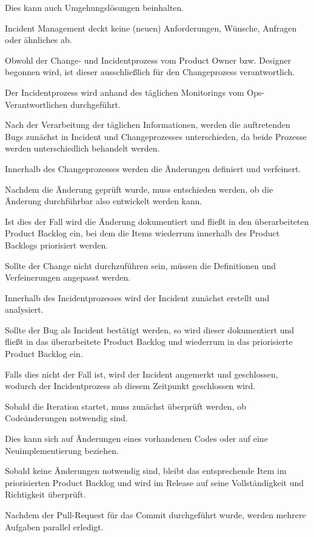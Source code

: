 Dies kann auch Umgehungslösungen beinhalten. 

Incident Management deckt keine (neuen) Anforderungen, Wünsche, Anfragen oder ähnliches ab.  

Obwohl der Change- und Incidentprozess vom Product Owner bzw. Designer begonnen wird, ist dieser ausschließlich für den Changeprozess verantwortlich. 

Der Incidentprozess wird anhand des täglichen Monitorings vom Ops-Verantwortlichen durchgeführt. 

Nach der Verarbeitung der täglichen Informationen, werden die auftretenden Bugs zunächst in Incident und Changeprozesses unterschieden, da beide Prozesse werden unterschiedlich behandelt werden.

Innerhalb des Changeprozesses werden die Änderungen definiert und verfeinert. 

Nachdem die Änderung geprüft wurde, muss entschieden werden, ob die Änderung durchführbar also entwickelt werden kann. 

Ist dies der Fall wird die Änderung dokumentiert und fließt in den überarbeiteten Product Backlog ein, bei dem die Items wiederrum innerhalb des Product Backlogs priorisiert werden. 

Sollte der Change nicht durchzuführen sein, müssen die Definitionen und Verfeinerungen angepasst werden.

Innerhalb des Incidentprozesses wird der Incident zunächst erstellt und analysiert.

Sollte der Bug als Incident bestätigt werden, so wird dieser dokumentiert und fließt in das überarbeitete Product Backlog und wiederrum in das priorisierte Product Backlog ein. 

Falls dies nicht der Fall ist, wird der Incident angemerkt und geschlossen, wodurch der Incidentprozess ab diesem Zeitpunkt geschlossen wird. 

Sobald die Iteration startet, muss zunächst überprüft werden, ob Codeänderungen notwendig sind. 

Dies kann sich auf Änderungen eines vorhandenen Codes oder auf eine Neuimplementierung beziehen. 

Sobald keine Änderungen notwendig sind, bleibt das entsprechende Item im priorisierten Product Backlog und wird im Release auf seine Vollständigkeit und Richtigkeit überprüft.

Nachdem der Pull-Request für das Commit durchgeführt wurde, werden mehrere Aufgaben parallel erledigt. 


